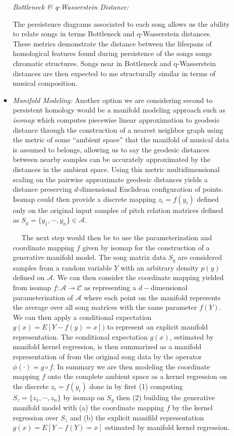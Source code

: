 \documentclass[11pt, a4paper]{article}
\begin{document}
\begin{enumerate}
\begin{itemize}
\begin{itemize}
      \textit{Bottleneck \& q-Wasserstein Distance:}

      The persistence diagrams associated to each song allows us the ability to relate songs in terms Bottleneck and q-Wasserstein distances. These metrics demonstrate the distance between the lifespans of homological features found during persistence of the songs songs chromatic structures. Songs near in Bottleneck and q-Wasserstein distances are then expected to me structurally similar in terms of musical composition. 

    \item {\large \textit{Manifold Modeling:}}
   Another option we are considering second to persistent homology would be a manifold modeling approach such as \textit{isomap} which computes piecewise linear approximation to geodesic distance through the construction of a nearest neighbor graph using the metric of some ``ambient space'' that the manifold of musical data is assumed to belongs, allowing us to say the geodesic distances between nearby samples can be accurately approximated by the distances in the ambient space. Using this metric multidimensional scaling on the pairwise approximate geodesic distances yields a distance preserving $d$-dimensional Euclidean configuration of points. Isomap could then provide a discrete mapping $z_i = f(y_i)$ defined only on the original input samples of pitch relation matrices defined as $S_y = \{y_1,\cdots , y_n \} \in \mathcal{A}$.

    $  \ \ \ \ $ The next step would then be to use the parameterization and coordinate mapping $f$ given by isomap for the construction of a generative manifold model. The  song  matrix data  $S_y$ are considered samples from a random variable $Y$ with an arbitrary density $p(y)$ defined on $\mathcal{A}$. We can then consider the coordinate mapping yielded from isomap  $f:\mathcal{A} \rightarrow \mathcal{C}$ as representing a $d-$dimensional parameterization of $\mathcal{A}$ where each point on the manifold represents the average over all song matrices with the same parameter $f(Y)$.  We can then apply a conditional expectation $g(x) = E[Y-f(y) = x])$ to represent an explicit manifold representation. The conditional expectation $g(x)$, estimated by manifold kernel regression, is then summarized as a manifold representation of from the original song data by the operator $\phi (\cdot ) = g\circ f$. In summary we are then  modeling the coordinate mapping $f$ onto the complete ambient space as a kernel regression on the discrete $z_i = f(y_i)$ done in by first (1) computing $S_z = \{ z_1, \cdots , z_n \}$ by isomap on $S_y$ then (2) building the generative manifold model with (a) the coordinate mapping $f$ by the kernel regression over $S_z$ and (b) the explicit manifild representation $g(x) = E[Y-f(Y)=x] $ estimated by manifold kernel regression.
    \end{itemize}
    

\end{itemize}
\end{enumerate}
\end{document}
